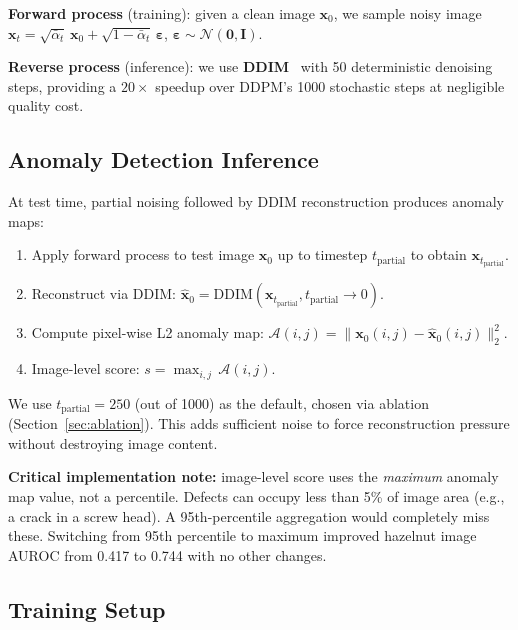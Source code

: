 \documentclass[11pt,letterpaper]{article}
\newcommand{\auroc}{\textsc{AUROC}}
\begin{document}
\textbf{Forward process} (training): given a clean image $\mathbf{x}_0$, we sample
noisy image $\mathbf{x}_t = \sqrt{\bar{\alpha}_t}\,\mathbf{x}_0 +
\sqrt{1 - \bar{\alpha}_t}\,\boldsymbol{\varepsilon}$, $\boldsymbol{\varepsilon} \sim
\mathcal{N}(\mathbf{0}, \mathbf{I})$.

\textbf{Reverse process} (inference): we use \textbf{DDIM}~\cite{ddim2021} with
50 deterministic denoising steps, providing a $20\times$ speedup over DDPM's 1000
stochastic steps at negligible quality cost.

\subsection{Anomaly Detection Inference}

At test time, partial noising followed by DDIM reconstruction produces anomaly maps:

\begin{enumerate}[leftmargin=*,itemsep=2pt]
  \item Apply forward process to test image $\mathbf{x}_0$ up to timestep $t_\text{partial}$
        to obtain $\mathbf{x}_{t_\text{partial}}$.
  \item Reconstruct via DDIM: $\hat{\mathbf{x}}_0 = \text{DDIM}(\mathbf{x}_{t_\text{partial}},
        t_\text{partial} \to 0)$.
  \item Compute pixel-wise L2 anomaly map:
        $\mathcal{A}(i,j) = \|\mathbf{x}_0(i,j) - \hat{\mathbf{x}}_0(i,j)\|_2^2$.
  \item Image-level score: $s = \max_{i,j}\,\mathcal{A}(i,j)$.
\end{enumerate}

We use $t_\text{partial} = 250$ (out of 1000) as the default, chosen via ablation
(Section~\ref{sec:ablation}). This adds sufficient noise to force reconstruction
pressure without destroying image content.

\textbf{Critical implementation note:} image-level score uses the \emph{maximum}
anomaly map value, not a percentile. Defects can occupy less than 5\% of image area
(e.g., a crack in a screw head). A 95th-percentile aggregation would completely miss
these. Switching from 95th percentile to maximum improved hazelnut image \auroc{}
from 0.417 to 0.744 with no other changes.

\subsection{Training Setup}
\end{document}
